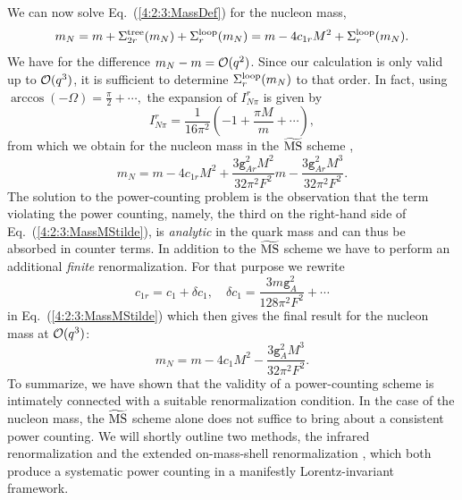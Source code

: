 \documentclass[twoside,12pt]{article}
\begin{document}
   We can now solve Eq.~(\ref{4:2:3:MassDef}) for the nucleon mass,
\begin{equation}
m_N=m+\Sigma^{\rm tree}_{2r}(m_N)+\Sigma^{\rm loop}_r(m_N)=m-4c_{1r}M^2+\Sigma^{\rm loop}_r(m_N).
\end{equation}
   We have for the difference $m_N-m={\cal O}(q^2)$.
Since our calculation is only valid up to ${\cal O}(q^3)$, it is sufficient
to determine $\Sigma^{\rm loop}_r(m_N)$ to that order.
   In fact, using $\arccos{(-\Omega)}=\frac{\pi}{2}+\cdots,$ the expansion of $I_{N\pi}^r$
is given by
\begin{equation}
\label{4:2:3:INpExp}
    I_{N\pi}^r=\frac{1}{16\pi^2}\left(-1+\frac{\pi M}{m}+\cdots\right),
\end{equation}
from which we obtain for the nucleon mass in the $\widetilde{\rm MS}$ scheme
\cite{Gasser:1987rb},
\begin{equation}
\label{4:2:3:MassMStilde}
    m_N=m-4c_{1r}M^2+
    \frac{3\texttt{g}_{Ar}^2M^2}{32\pi^2F^2}m
    -\frac{3\texttt{g}_{Ar}^2M^3}{32\pi^2F^2}.
\end{equation}
   The solution to the power-counting problem is the observation
that the term violating the power counting, namely, the third on the right-hand side
of Eq.~(\ref{4:2:3:MassMStilde}), is \emph{analytic} in the quark mass
and can thus be absorbed in counter terms.
   In addition to the $\widetilde{\rm MS}$ scheme we have to perform an additional
{\em finite} renormalization.
   For that purpose we rewrite
\begin{equation}
\label{4:2:3:cRenorm}
    c_{1r}=c_1+\delta c_1,\quad \delta c_1 =\frac{3 m {\texttt g}_A^2}{128 \pi^2 F^2}+\cdots
\end{equation}
in Eq.~(\ref{4:2:3:MassMStilde}) which then gives the
final result for the nucleon mass at ${\cal O}(q^3)$:
\begin{equation}
\label{4:2:3:MassFinal}
    m_N=m-4c_{1}M^2
    -\frac{3\texttt{g}_{A}^2M^3}{32\pi^2F^2}.
\end{equation}
   To summarize, we have shown that the validity of a power-counting scheme is intimately
connected with a suitable renormalization condition.
   In the case of the nucleon mass, the $\widetilde{\rm MS}$ scheme alone does not
suffice to bring about a consistent power counting.
   We will shortly outline two methods, the infrared renormalization \cite{Becher:1999he}
and the extended on-mass-shell renormalization \cite{Fuchs:2003qc}, which both produce
a systematic power counting in a manifestly Lorentz-invariant framework.
\end{document}
